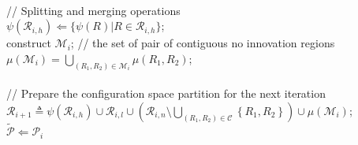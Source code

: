 \begin{algorithm}[t]
{			\nl \\ // Splitting and merging operations\\
			\nl $\psi(\mathscr{R}_{i,h}) \Leftarrow \lbrace 
					\psi(R) | R\in \mathscr{R}_{i,h}	
				\rbrace$; \\
			\nl construct $\mathscr{M}_i$; // the set of pair of contiguous no innovation regions \\
			\nl $\mu(\mathscr{M}_i) = \bigcup_{(R_1,R_2)\in\mathscr{M}_i} \mu(R_1,R_2)$;\\
			\nl\\ // Prepare the configuration space partition for the next iteration \\
			\nl $\mathcal{R}_{i+1} \triangleq
	\psi\left(\mathscr{R}_{i,h}\right) \cup \mathcal{R}_{i,l}\cup
	\left(\mathcal{R}_{i,n}\setminus\bigcup_{\left(R_{1},R_{2}\right)\in\mathcal{C}}\left\{ R_{1},R_{2}\right\} \right)\cup \mu(\mathscr{M}_i)$;\\
		}
	\nl $\tilde{\mathscr{P}} \Leftarrow \mathscr{P}_i$
\end{algorithm}
%
